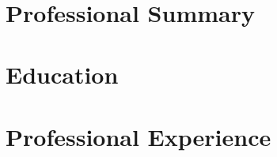 \documentclass[11pt,a4paper]{article}
\begin{document}
\begin{center}
\begin{minipage}[t]{0.7\textwidth}
\begin{flushleft}
            \vspace{0.5em}
            \begin{center}
                \color{white} \color{white} \location \\
                \color{white}\textit{\locationExtra}
            \end{center}
        \end{flushleft}
    \end{minipage}
\end{center}


\section{Professional Summary}
\summary

\section{Education}

\subsection{\degree}
\textit{\institution} \hfill \textit{\educationPeriod}
\begin{itemize}
    \education
\end{itemize}
\educationSkills

\subsection{\degreeTwo}
\textit{\institutionTwo} \hfill \textit{\educationPeriodTwo}
\begin{itemize}
    \educationTwo
\end{itemize}
\educationSkillsTwo

\section{Professional Experience}

\subsection{\positionTitle}
\textit{\positionLocation} \hfill \textit{\positionPeriod}
\begin{itemize}
    \positionExperience
\end{itemize}
\positionSkills
\end{document}
